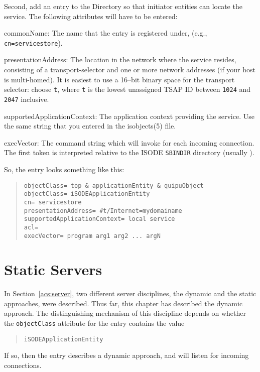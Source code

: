 Second,
add an entry to the Directory so that initiator entities can locate the
service.
The following attributes will have to be entered:
\begin{describe}
\item[commonName:]
The name that the entry is registered under,
(e.g., \verb"cn=servicestore").

\item[presentationAddress:]
The location in the network where the service resides,
consisting of a transport-selector and one or more network addresses
(if your host is multi-homed).
It is easiest to use a 16--bit binary space for the transport selector:
choose \verb"t",
where \verb"t" is the lowest unassigned TSAP ID between \verb"1024" and
\verb"2047" inclusive.

\item[supportedApplicationContext:]
The application context providing the service.
Use the same string that you entered in the \man isobjects(5) file.

\item[execVector:]
The command string which  will invoke for each incoming connection.
The first token is interpreted relative to the ISODE \verb"SBINDIR" directory
(usually ).
\end{describe}
So,
the entry  looks something like this:
\begin{quote}\small\begin{verbatim}
objectClass= top & applicationEntity & quipuObject
objectClass= iSODEApplicationEntity
cn= servicestore
presentationAddress= #t/Internet=mydomainame
supportedApplicationContext= local service
acl=
execVector= program arg1 arg2 ... argN
\end{verbatim}\end{quote}

\section	{Static Servers}\label{service:static}
In Section~\ref{acs:server},
two different server disciplines,
the dynamic and the static approaches,
were described.
Thus far,
this chapter has described the dynamic approach.
The distinguishing mechanism of this discipline depends on whether
the \verb"objectClass" attribute for the entry contains the value
\begin{quote}\small\begin{verbatim}
iSODEApplicationEntity
\end{verbatim}\end{quote}
If so,
then the entry describes a dynamic approach,
and  will listen for incoming connections.

